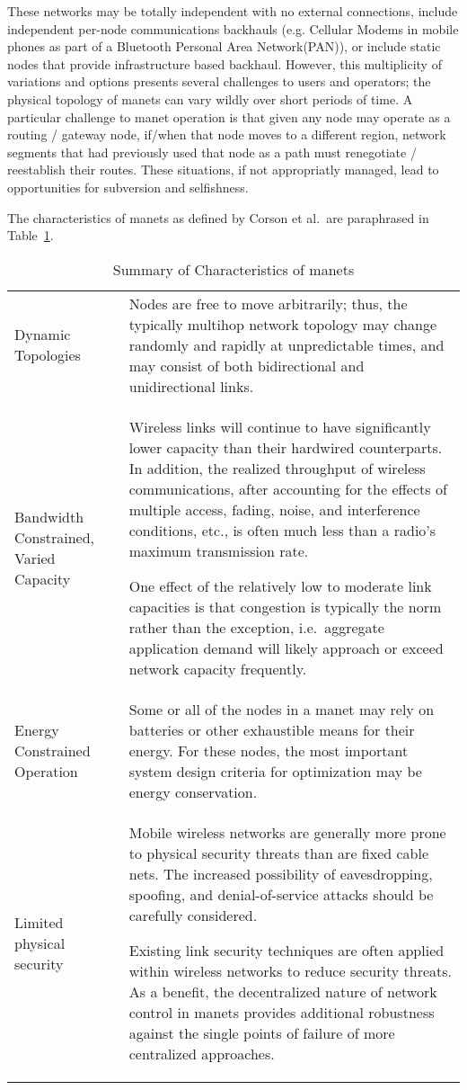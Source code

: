 These networks may be totally independent with no external connections, include independent per-node communications backhauls (e.g.
Cellular Modems in mobile phones as part of a Bluetooth Personal Area Network(PAN)), or include static nodes that provide infrastructure based backhaul.
However, this multiplicity of variations and options presents several challenges to users and operators; the physical topology of \glspl{manet} can vary wildly over short periods of time.
A particular challenge to \gls{manet} operation is that given any node may operate as a routing / gateway node, if/when that node moves to a different region, network segments that had previously used that node as a path must renegotiate / reestablish their routes.
These situations, if not appropriatly managed, lead to opportunities for subversion and selfishness.

The characteristics of \gls{manet}s as defined by Corson et al.\ are paraphrased in Table~\ref{tab:manet_characteristics}.

\begin{table}
\caption[Summary of Characteristics of \gls{manet}s]{Summary of Characteristics of \gls{manet}s\cite{Corson1999}}
\label{tab:manet_characteristics}
  \begin{tabularx}{\textwidth}{p{2cm}X}\toprule
    Dynamic Topologies & Nodes are free to move arbitrarily; thus, the typically multihop network topology may change randomly and rapidly at unpredictable times, and may consist of both bidirectional and unidirectional links.
\\
    Bandwidth Constrained, Varied Capacity & Wireless links will continue to have significantly lower capacity than their hardwired counterparts.
In addition, the realized throughput of wireless communications, after accounting for the effects of multiple access, fading, noise, and interference conditions, etc., is often much less than a radio's maximum transmission rate.
\par
One effect of the relatively low to moderate link capacities is that congestion is typically the norm rather than the exception, i.e.\  aggregate application demand will likely approach or exceed network capacity frequently.\\
    Energy Constrained Operation &  Some or all of the nodes in a \gls{manet} may rely on batteries or other exhaustible means for their energy.
For these nodes, the most important system design criteria for optimization may be energy conservation.\\
    Limited physical security & Mobile wireless networks are generally more prone to physical security threats than are fixed cable nets.
The increased possibility of eavesdropping, spoofing, and denial-of-service attacks should be carefully considered.\par
Existing link security techniques are often applied within wireless networks to reduce security threats.
As a benefit, the decentralized nature of network control in \gls{manet}s provides additional robustness against the single points of failure of more centralized approaches.\\\bottomrule
\end{tabularx}
\end{table}

